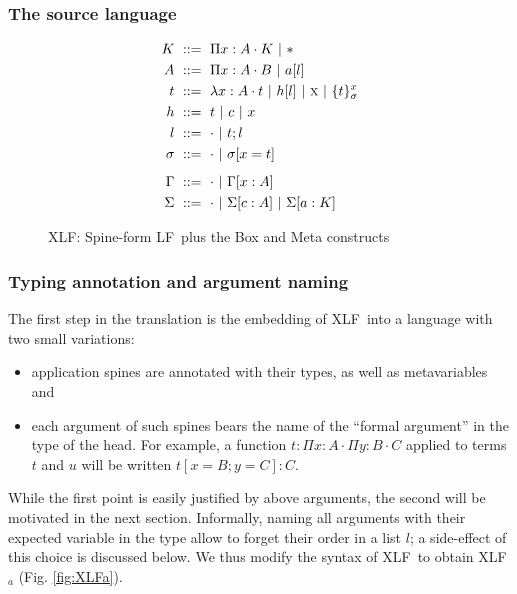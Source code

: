 \documentclass[preprint]{sigplanconf}
\newcommand\gor{\ |\ }
\newcommand\gequal{\ ::=\ }
\newcommand\meta[1]{\textsc{#1}}
\newcommand\mv{x}
\newcommand\mmv{y}
\newcommand\mmeta{\meta x}
\newcommand\mco{c}
\newcommand\mcf{a}
\newcommand\postbinder{\cdot}
\newcommand\prd[2]{\Pi{#1}:{#2}\postbinder}
\newcommand\tlam[2]{\lambda{#1}:{#2}\postbinder}
\newcommand\lam{\tlam}
\newcommand\obox[3]{\{{#1}\}^{#2}_{#3}}
\newcommand\srt[1]{\mathsf{#1}}
\newcommand\type{\srt *}
\newcommand\lapp[2]{{#1}[{#2}]}
\newcommand\laapp[3]{{#1}[{#2}]:{#3}}
\newcommand\lnil{\cdot}
\newcommand\lcons[2]{{#1};{#2}}
\newcommand\lncons[3]{{#1}={#2};{#3}}
\newcommand\lnsing[2]{{#1}={#2}}
\newcommand\enil\cdot
\newcommand\eent[1]{[{#1}]}
\newcommand\econs[2]{{#1}\eent{#2}}
\newcommand\ebinddecl[3]{\econs{#1}{{#2}:{#3}}}
\newcommand\snil\enil
\newcommand\sent[2]{[{#1}={#2}]}
\newcommand\scons[3]{{#1}\sent{#2}{#3}}
\newcommand\lang[1]{\textsf{#1}}
\newcommand\LF{\lang{LF}}
\newcommand\XLF{\lang{XLF}}
\newcommand\XLFa{\lang{XLF$_a$}}
\newcommand\XLFmod[1]{#1}
\def\inXLF{\def\thelangmod{\XLFmod}}
\newcommand\mk{\thelangmod{K}}
\newcommand\mf{\thelangmod{A}}
\newcommand\mmf{\thelangmod{B}}
\newcommand\mmmf{\thelangmod{C}}
\newcommand\mo{\thelangmod{t}}
\newcommand\mmo{\thelangmod{u}}
\newcommand\mh{\thelangmod{h}}
\newcommand\ma{\thelangmod{l}}
\newcommand\ms{\thelangmod{\sigma}}
\newcommand\me{\thelangmod{\Gamma}}
\newcommand\msi{\thelangmod{\Sigma}}
\begin{document}
\subsubsection{The source language}

\begin{figure}
  \inXLF
  \begin{align*}
    \mk &\gequal { \prd\mv\mf\mk \gor \type } \\
    \mf &\gequal { \prd\mv\mf\mmf \gor \lapp\mcf\ma } \\
    \mo &\gequal { \lam\mv\mf\mo \gor \lapp\mh\ma \gor \mmeta \gor \obox\mo\mv\ms } \\
    \mh &\gequal { \mo \gor \mco \gor \mv } \\
    \ma &\gequal { \lnil \gor \lcons\mo\ma } \\
    \ms &\gequal { \snil \gor \scons \sigma\mv\mo } \\[0.5em]
    \me &\gequal { \enil \gor \ebinddecl \Gamma\mv\mf } \\
    \msi &\gequal { \enil \gor \ebinddecl\msi\mco\mf \gor
      \ebinddecl\msi\mcf\mk }
  \end{align*}
  \caption{\XLF: Spine-form \LF\ plus the \textsf{Box} and \textsf{Meta} constructs}
\end{figure}

\subsubsection{Typing annotation and argument naming}

The first step in the translation is the embedding of \XLF\ into a
language with two small variations:
\begin{itemize}
\item application spines are annotated with their types, as well as
  metavariables and
\item \inXLF each argument of such spines bears the name of the ``formal
  argument'' in the type of the head. For example, a function $\mo :
  \prd\mv\mf\prd\mmv\mmf\mmmf$ applied to terms $\mo$ and $\mmo$ will be written
  $\laapp{\mo}{\lncons \mv \mmf {\lnsing\mmv\mmmf}} C$.
\end{itemize}

While the first point is easily justified by above arguments, the
second will be motivated in the next section. Informally, naming all
arguments with their expected variable in the type allow to forget
their order in a list $l$; a side-effect of this choice is discussed
below. We thus modify the syntax of \XLF\ to obtain \XLFa
(Fig. \ref{fig:XLFa}).
\end{document}
